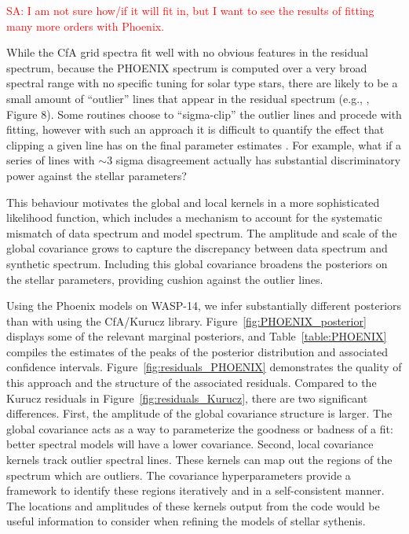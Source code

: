 \documentclass[iop,floatfix]{emulateapj}
\newcommand{\comm}[1]{ \textcolor{red}{SA: #1}}
\begin{document}
\comm{I am not sure how/if it will fit in, but I want to see the results of fitting many more 
orders with Phoenix.}

While the CfA grid spectra fit well with no obvious features in the residual spectrum, because the PHOENIX spectrum is computed over a very broad spectral range with no specific tuning for solar type stars, there are likely to be a small amount of  ``outlier'' lines that appear in the residual spectrum (e.g., \citealt{husser13}, Figure 8). Some routines choose to ``sigma-clip'' the outlier lines and procede with fitting, however with such an approach it is difficult to quantify the effect that clipping a given line has on the final parameter estimates \citep{hogg10}. For example, what if a series of lines with $\sim$3 sigma disagreement actually has substantial discriminatory power against the stellar parameters? 

This behaviour motivates the global and local kernels in a more sophisticated likelihood function, which includes a mechanism to account for the systematic mismatch of data spectrum and model spectrum.  The amplitude and scale of the global covariance grows to capture the discrepancy between data spectrum and synthetic spectrum. Including this global covariance broadens the posteriors on the stellar parameters, providing cushion against the outlier lines.  

Using the {\sc Phoenix} models on WASP-14, we infer substantially different posteriors than with using the {\sc CfA/Kurucz} library. Figure~\ref{fig:PHOENIX_posterior} displays some of the relevant marginal posteriors, and Table~\ref{table:PHOENIX} compiles the estimates of the peaks of the posterior distribution and associated confidence intervals. Figure~\ref{fig:residuals_PHOENIX} demonstrates the quality of this approach and the structure of the associated residuals. Compared to the Kurucz residuals in Figure~\ref{fig:residuals_Kurucz}, there are two significant differences. First, the amplitude of the global covariance structure is larger. The global covariance acts as a way to parameterize the goodness or badness of a fit: better spectral models will have a lower covariance. Second, local covariance kernels track outlier spectral lines. These kernels can map out the regions of the spectrum which are outliers. The covariance hyperparameters provide a framework to identify these regions iteratively and in a self-consistent manner. The locations and amplitudes of these kernels output from the code would be useful information to consider when refining the models of stellar sythenis.
\end{document}
